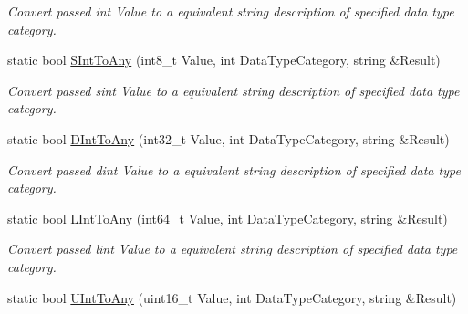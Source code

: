 \begin{DoxyCompactItemize}
\begin{DoxyCompactList}\small\item\em Convert passed int Value to a equivalent string description of specified data type category. \end{DoxyCompactList}\item 
static bool \hyperlink{classpc__emulator_1_1DataTypeUtils_a060e4406c657e256fb52994c8df26e2a}{S\+Int\+To\+Any} (int8\+\_\+t Value, int Data\+Type\+Category, string \&Result)\hypertarget{classpc__emulator_1_1DataTypeUtils_a060e4406c657e256fb52994c8df26e2a}{}\label{classpc__emulator_1_1DataTypeUtils_a060e4406c657e256fb52994c8df26e2a}

\begin{DoxyCompactList}\small\item\em Convert passed sint Value to a equivalent string description of specified data type category. \end{DoxyCompactList}\item 
static bool \hyperlink{classpc__emulator_1_1DataTypeUtils_a02738761f3d14d3e8cd4a6f5da03faee}{D\+Int\+To\+Any} (int32\+\_\+t Value, int Data\+Type\+Category, string \&Result)\hypertarget{classpc__emulator_1_1DataTypeUtils_a02738761f3d14d3e8cd4a6f5da03faee}{}\label{classpc__emulator_1_1DataTypeUtils_a02738761f3d14d3e8cd4a6f5da03faee}

\begin{DoxyCompactList}\small\item\em Convert passed dint Value to a equivalent string description of specified data type category. \end{DoxyCompactList}\item 
static bool \hyperlink{classpc__emulator_1_1DataTypeUtils_aa28b3185bb419706594f4b9b660fe932}{L\+Int\+To\+Any} (int64\+\_\+t Value, int Data\+Type\+Category, string \&Result)\hypertarget{classpc__emulator_1_1DataTypeUtils_aa28b3185bb419706594f4b9b660fe932}{}\label{classpc__emulator_1_1DataTypeUtils_aa28b3185bb419706594f4b9b660fe932}

\begin{DoxyCompactList}\small\item\em Convert passed lint Value to a equivalent string description of specified data type category. \end{DoxyCompactList}\item 
static bool \hyperlink{classpc__emulator_1_1DataTypeUtils_a2ac017f0098d96cecfadd6ef7b6b4c25}{U\+Int\+To\+Any} (uint16\+\_\+t Value, int Data\+Type\+Category, string \&Result)\hypertarget{classpc__emulator_1_1DataTypeUtils_a2ac017f0098d96cecfadd6ef7b6b4c25}{}\label{classpc__emulator_1_1DataTypeUtils_a2ac017f0098d96cecfadd6ef7b6b4c25}


\end{DoxyCompactItemize}
